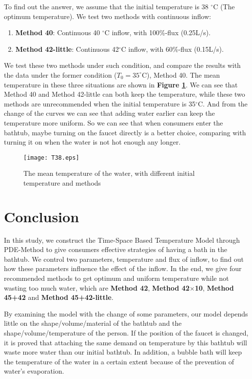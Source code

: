 \documentclass{HZNUMCM}
\begin{document}
To find out the answer, we assume that the initial temperature is 38 $^\circ$C (The optimum
temperature). We test two methods with continuous inflow:
\begin{enumerate}[\qquad \bf 1.]
    \item \textbf{Method 40}: Continuous 40 $^\circ$C inflow, with 100\%-flux (0.25L/s).
    \item \textbf{Method 42-little}: Continuous 42$^\circ$C inflow, with 60\%-flux (0.15L/s).
\end{enumerate}
We test these two methods under such condition, and compare the results with the data under the
former condition ($T_0=35^\circ$C), Method 40. The mean temperature in these three situations are
shown in \textbf{Figure \ref{38}}. We can see that Method 40 and Method 42-little can both keep the
temperature, while these two methods are unrecommended when the initial temperature is 35$^\circ$C.
And from the change of the curves we can see that adding water earlier can keep the temperature more
uniform. So we can see that when consumers enter the bathtub, maybe turning on the faucet directly
is a better choice, comparing with turning it on when the water is not hot enough any longer.
\begin{figure}[!htbp]
\small
\centering
\texttt{[image: T38.eps]}
\caption{The mean temperature of the water, with different initial temperature and methods}
\label{38}
\end{figure}

\section{Conclusion}
In this study, we construct the Time-Space Based Temperature Model through PDE-Method to give
consumers effective strategies of having a bath in the bathtub. We control two parameters,
temperature and flux of inflow, to find out how these parameters influence the effect of the inflow.
In the end, we give four recommended methods to get optimum and uniform temperature while not
wasting too much water, which are \textbf{Method 42}, \textbf{Method 42$\times$10}, \textbf{Method
45+42} and \textbf{Method 45+42-little}.

By examining the model with the change of some parameters, our model depends little on the
shape/volume/material of the bathtub and the shape/volume/temperature of the person. If the position
of the faucet is changed, it is proved that attaching the same demand on temperature by this bathtub
will waste more water than our initial bathtub. In addition, a bubble bath will keep the temperature
of the water in a certain extent because of the prevention of water's evaporation.
\end{document}
